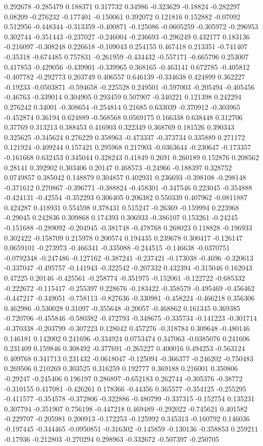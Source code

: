 0.292678 -0.285479 0.188371 0.317732 0.34986 -0.323629 -0.18824 -0.282297 0.08209 -0.276232 -0.177401 -0.150061 0.392072 0.121816 0.152882 -0.07092 0.512956 -0.448344 -0.313359 -0.400871 -0.125086 -0.0605259 -0.305972 -0.296953 0.302744 -0.351443 -0.237027 -0.246004 -0.236693 -0.296249 0.432177 0.183136 -0.216097 -0.308248 0.226618 -0.109043 0.254155 0.467418 0.213351 -0.741407 -0.35318 -0.674485 0.757831 -0.261959 -0.434432 -0.557171 -0.665796 0.253007 0.417853 -0.429056 -0.439901 -0.339965 0.368165 -0.463141 0.672785 -0.405812 -0.407782 -0.292773 0.203749 0.406557 0.646139 -0.334638 0.424899 0.362227 -0.19233 -0.0503871 -0.594658 -0.225528 0.249501 -0.597003 -0.205494 -0.405456 -0.46763 -0.339014 0.304905 0.293459 0.507907 -0.340221 0.121398 0.242294 0.276242 0.34001 -0.308654 -0.254814 0.21685 0.633039 -0.370912 -0.303965 -0.452874 0.36194 0.624889 -0.568568 0.0569175 0.166338 0.638448 0.312706 0.37769 0.313213 0.388453 0.416903 0.322349 0.368769 0.181526 0.390343 0.325625 -0.345624 0.276229 0.358963 -0.473337 -0.373734 0.335889 0.271172 0.121924 -0.409244 0.157421 0.295968 0.217903 -0.0363644 -0.230647 -0.173357 -0.161668 0.632453 0.345044 0.328243 0.41849 0.2691 0.260189 0.152876 0.208562 0.28141 0.392902 0.303406 0.20147 0.468573 -0.24966 -0.188397 0.328752 0.0749857 0.385042 0.148879 0.304857 0.402931 0.236693 -0.398108 -0.298148 -0.371612 0.270867 -0.396771 -0.388824 -0.458301 -0.347546 0.223045 -0.354888 -0.424131 -0.42554 -0.352293 0.306405 0.206382 0.550339 0.407962 -0.0811887 0.424287 0.418931 0.554598 0.378431 0.515247 -0.26369 -0.159994 0.223968 -0.29045 0.242836 0.309868 0.174393 0.306933 -0.386107 0.153261 -0.24245 -0.151688 -0.289092 -0.204945 -0.381748 -0.478768 0.268023 0.118828 -0.196933 0.302422 -0.158709 0.215978 0.200574 0.194435 0.239678 0.300417 -0.126147 0.0659101 -0.273973 -0.466341 -0.335088 -0.244515 -0.146638 -0.0370751 -0.0792348 -0.247486 -0.127162 -0.387241 -0.237421 -0.173038 -0.4696 -0.320613 -0.337047 -0.495757 -0.141943 -0.322542 -0.207332 0.432394 -0.315046 0.162043 0.47225 0.20146 -0.425561 -0.258774 -0.351975 -0.152061 -0.122722 -0.685332 -0.222672 -0.115417 -0.255397 0.228676 -0.183422 -0.358579 -0.495469 -0.456462 -0.447217 -0.349051 -0.758113 -0.827636 -0.330981 -0.458224 -0.466218 0.356306 0.462986 -0.530028 0.31097 -0.355648 -0.20057 -0.468862 0.161345 0.369385 -0.720706 -0.455846 -0.580382 -0.472793 -0.348675 -0.335734 -0.141223 -0.301714 -0.370338 -0.203799 -0.307223 0.128042 0.457276 -0.318784 0.309648 -0.480146 0.146181 0.142002 0.241696 -0.334924 0.0753474 0.347063 -0.0385076 0.241606 0.231409 0.159846 0.308492 -0.377691 -0.265227 0.400016 0.494253 -0.563124 0.409768 0.341713 0.231432 -0.0618047 -0.125094 -0.366377 -0.246202 -0.750483 0.269506 0.210269 0.303525 0.316259 0.192777 0.369188 0.216001 0.350806 -0.29247 -0.245406 0.196197 0.286897 -0.652183 0.262744 -0.305376 -0.38772 -0.310155 0.417081 -0.426261 0.178366 -0.44356 0.365577 -0.354125 -0.255295 -0.411577 -0.354578 -0.372806 -0.322886 -0.480799 -0.337315 -0.152754 0.135231 0.307794 -0.351907 0.756198 -0.447218 0.469489 -0.292022 -0.745621 0.401582 -0.229707 -0.205981 0.200913 -0.172253 -0.125992 0.345313 -0.160792 0.146036 -0.197445 -0.344465 -0.0950851 -0.316302 -0.145859 -0.130136 -0.358853 0.259211 -0.17936 -0.212803 -0.270294 0.298963 -0.332672 -0.507397 -0.250705 